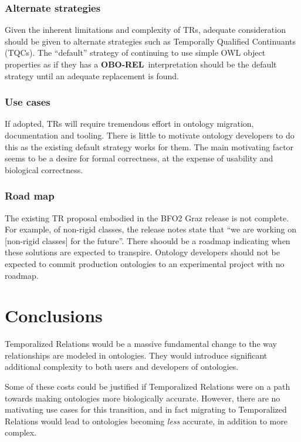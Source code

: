 \documentclass{bioinfo}
\def\OBOREL{\textbf{OBO-REL}}
\begin{document}
\subsubsection{Alternate strategies} Given the inherent limitations
and complexity of TRs, adequate consideration should be given to
alternate strategies such as Temporally Qualified Continuants
(TQCs). The ``default'' strategy of continuing to use simple OWL
object properties as if they has a \OBOREL\ interpretation should be
the default strategy until an adequate replacement is found.

\subsubsection{Use cases} If adopted, TRs will require tremendous
effort in ontology migration, documentation and tooling. There is
little to motivate ontology developers to do this as the existing
default strategy works for them. The main motivating factor seems to
be a desire for formal correctness, at the expense of usability and
biological correctness. 

\subsubsection{Road map} The existing TR proposal embodied in the BFO2
Graz release is not complete. For example, of non-rigid classes, the
release notes state that ``we are working on [non-rigid classes] for
the future''. There shoould be a roadmap indicating when these
solutions are expected to transpire. Ontology developers should not be
expected to commit production ontologies to an experimental project
with no roadmap.


\section{Conclusions}

Temporalized Relations would be a massive fundamental change to the
way relationships are modeled in ontologies. They would introduce
significant additional complexity to both users and developers of
ontologies.

Some of these costs could be justified if Temporalized Relations were
on a path towards making ontologies more biologically
accurate. However, there are no mativating use cases for this
transition, and in fact migrating to Temporalized Relations would lead
to ontologies becoming \emph{less} accurate, in addition to more
complex.
\end{document}
